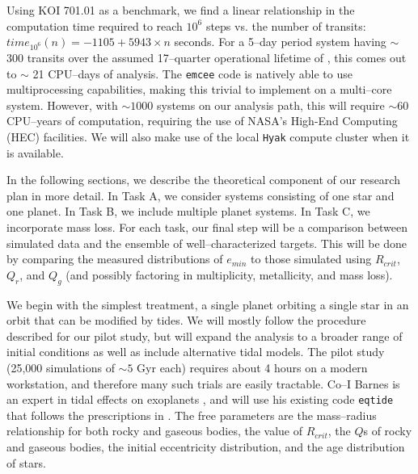 Using KOI 701.01 as a benchmark, we find a linear relationship in the
computation time required to reach $10^6$ steps vs. the number of
transits: $time_{10^6}(n) = -1105 + 5943 \times n$ seconds.
%
For a 5--day period system having $\sim$ 300 transits over the assumed
17--quarter operational lifetime of \kepler, this comes out to $\sim$
21 CPU--days of analysis.  The {\tt emcee} code is natively able to
use multiprocessing capabilities, making this trivial to implement on
a multi--core system.  However, with $\sim 1000$ systems on our
analysis path, this will require $\sim 60$ CPU--years of computation,
requiring the use of NASA's High-End Computing (HEC) facilities.  We
will also make use of the local {\tt Hyak} compute cluster when it is
available.

\medskip
{\centerline{}}
\smallskip

In the following sections, we describe the theoretical component of
our research plan in more detail.  In Task A, we consider systems
consisting of one star and one planet.  In Task B, we include multiple
planet systems. In Task C, we incorporate mass loss.  For each task,
our final step will be a comparison between simulated data and the
ensemble of well--characterized \kepler targets.  This will be done by
comparing the measured distributions of $e_{min}$ to those simulated
using $R_{crit}$, $Q_r$, and $Q_g$ (and possibly factoring in
multiplicity, metallicity, and mass loss).

\medskip
{\centerline{}}
\smallskip

We begin with the simplest treatment, a single planet orbiting a
single star in an orbit that can be modified by tides.  We will mostly
follow the procedure described for our pilot study, but will expand
the analysis to a broader range of initial conditions as well as
include alternative tidal models.  The pilot study (25,000 simulations
of $\sim 5$ Gyr each) requires about 4 hours on a modern workstation,
and therefore many such trials are easily tractable.  Co--I Barnes is
an expert in tidal effects on exoplanets
\citep{Barnes08,Jackson08,Barnes09,Barnes13}, and will use his
existing code \texttt{eqtide} that follows the prescriptions in
\cite{Barnes13}.  The free parameters are the mass--radius
relationship for both rocky and gaseous bodies, the value of
$R_{crit}$, the $Q$s of rocky and gaseous bodies, the initial
eccentricity distribution, and the age distribution of \kepler stars.

